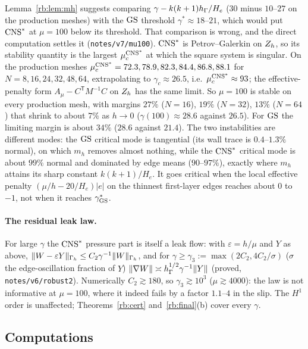 \begin{remark}[The production penalty $\mu=100$ for $\CNS$]\label{rb:rem:mu100}
Lemma~\ref{rb:lem:mh} suggests comparing $\gamma-k(k+1)h_\Gamma/H_e$ ($30$ minus $10$--$27$ on the production meshes) with the $\mathrm{GS}$ threshold $\gamma^\ast\approx18$--$21$, which would put $\CNS$ at $\mu=100$ below its threshold. That comparison is wrong, and the direct computation settles it (\texttt{notes/v7/mu100}). $\CNS$ is Petrov--Galerkin on $Z_h$, so its stability quantity is the largest $\mu_c^{\mathrm{CNS}^\ast}$ at which the square system is singular. On the production meshes $\mu_c^{\mathrm{CNS}^\ast}=72.3,78.9,82.3,84.4,86.8,88.1$ for $N=8,16,24,32,48,64$, extrapolating to $\gamma_c\approx26.5$, i.e.\ $\mu_c^{\mathrm{CNS}^\ast}\approx93$; the effective-penalty form $A_\mu-C^{\mathsf T}M^{-1}C$ on $Z_h$ has the same limit. So $\mu=100$ is stable on every production mesh, with margins $27\%$ ($N=16$), $19\%$ ($N=32$), $13\%$ ($N=64$) that shrink to about $7\%$ as $h\to0$ ($\gamma(100)\approx28.6$ against $26.5$). For $\mathrm{GS}$ the limiting margin is about $34\%$ ($28.6$ against $21.4$). The two instabilities are different modes: the $\mathrm{GS}$ critical mode is tangential (its wall trace is $0.4$--$1.3\%$ normal), on which $m_h$ removes almost nothing, while the $\CNS$ critical mode is about $99\%$ normal and dominated by edge means ($90$--$97\%$), exactly where $m_h$ attains its sharp constant $k(k+1)/H_e$. It goes critical when the local effective penalty $(\mu/h-20/H_e)|e|$ on the thinnest first-layer edges reaches about $0$ to $-1$, not when it reaches $\gamma^\ast_{\mathrm{GS}}$.
\end{remark}

\paragraph{The residual leak law.} For large $\gamma$ the $\CNS$ pressure part is itself a leak flow: with $\varepsilon=h/\mu$ and $Y$ as above, $\lVert W-\varepsilon Y\rVert_{\Gamma_h}\le C_2\gamma^{-1}\lVert W\rVert_{\Gamma_h}$, and for $\gamma\ge\gamma_3:=\max(2C_2,4C_2/\sigma)$ ($\sigma$ the edge-oscillation fraction of $Y$) $\lVert \nabla W\rVert\asymp h_\Gamma^{1/2}\gamma^{-1}\lVert Y\rVert$ (proved, \texttt{notes/v6/robust2}). Numerically $C_2\gtrsim180$, so $\gamma_3\gtrsim10^3$ ($\mu\gtrsim4000$): the law is not informative at $\mu=100$, where it indeed fails by a factor $1.1$--$4$ in the slip. The $H^1$ order is unaffected; Theorems~\ref{rb:cert} and~\ref{rb:final}(b) cover every $\gamma$.

\subsection{Computations}


